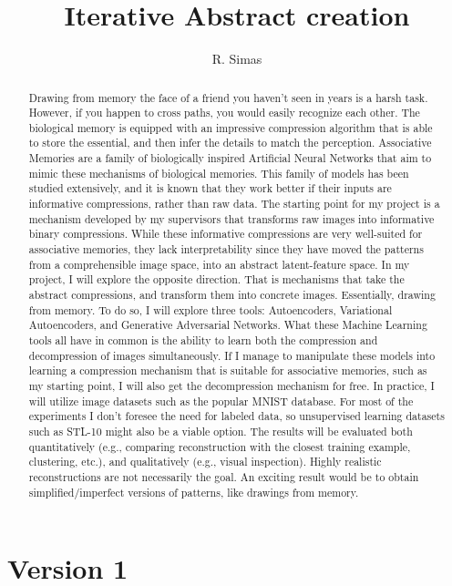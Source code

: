 \documentclass{article}
\title{Iterative Abstract creation}
\author{R. Simas }
\begin{document}
\maketitle

\section{Version 1}

\begin{abstract}
Drawing from memory the face of a friend you haven't seen in years is a harsh task. However, if you happen to cross paths, you would easily recognize each other.
The biological memory is equipped with an impressive compression algorithm that is able to store the essential, and then infer the details to match the perception.
Associative Memories are a family of biologically inspired Artificial Neural Networks that aim to mimic these mechanisms of biological memories.
This family of models has been studied extensively, and it is known that they work better if their inputs are informative compressions, rather than raw data.
The starting point for my project is a mechanism developed by my supervisors that transforms raw images into informative binary compressions.
While these informative compressions are very well-suited for associative memories, they lack interpretability since they have moved the patterns from a comprehensible image space, into an abstract latent-feature space.
In my project, I will explore the opposite direction. That is mechanisms that take the abstract compressions, and transform them into concrete images. Essentially, drawing from memory. 
To do so, I will explore three tools: Autoencoders, Variational Autoencoders, and Generative Adversarial Networks. What these Machine Learning tools all have in common is the ability to learn both the compression and decompression of images simultaneously. If I manage to manipulate these models into learning a compression mechanism that is suitable for associative memories, such as my starting point, I will also get the decompression mechanism for free.
In practice, I will utilize image datasets such as the popular MNIST database. For most of the experiments I don't foresee the need for labeled data, so unsupervised learning datasets such as STL-10 might also be a viable option.
The results will be evaluated both quantitatively (e.g., comparing reconstruction with the closest training example, clustering, etc.), and qualitatively (e.g., visual inspection). Highly realistic reconstructions are not necessarily the goal. An exciting result would be to obtain simplified/imperfect versions of patterns, like drawings from memory.

\end{abstract}
\newpage
\end{document}
